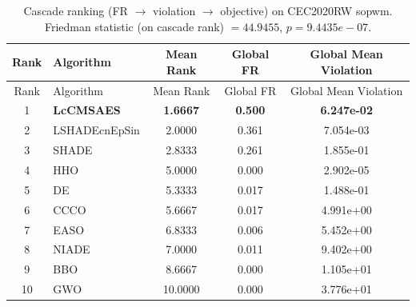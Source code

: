 \begin{center}
\small
\renewcommand{\arraystretch}{1.25}
\begin{longtable}{clccc}
\caption{Cascade ranking (FR $\to$ violation $\to$ objective) on CEC2020RW  sopwm. Friedman statistic (on cascade rank) $=44.9455$, $p=9.4435e-07$.}
\label{tab:cascade_ranking_CEC2020RW_sopwm} \\
\toprule
Rank & Algorithm & Mean Rank & Global FR & Global Mean Violation \\
\midrule
\endfirsthead
\toprule
Rank & Algorithm & Mean Rank & Global FR & Global Mean Violation \\
\midrule
\endhead
1 & \textbf{LcCMSAES} & \textbf{1.6667} & \textbf{0.500} & \textbf{6.247e-02} \\
2 & LSHADEcnEpSin & 2.0000 & 0.361 & 7.054e-03 \\
3 & SHADE & 2.8333 & 0.261 & 1.855e-01 \\
4 & HHO & 5.0000 & 0.000 & 2.902e-05 \\
5 & DE & 5.3333 & 0.017 & 1.488e-01 \\
6 & CCCO & 5.6667 & 0.017 & 4.991e+00 \\
7 & EASO & 6.8333 & 0.006 & 5.452e+00 \\
8 & NIADE & 7.0000 & 0.011 & 9.402e+00 \\
9 & BBO & 8.6667 & 0.000 & 1.105e+01 \\
10 & GWO & 10.0000 & 0.000 & 3.776e+01 \\
\bottomrule
\end{longtable}
\end{center}